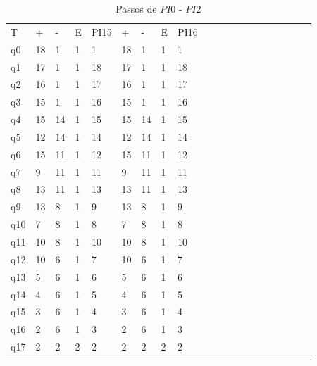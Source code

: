 \documentclass[12pt,a4paper]{report}
\begin{document}
\begin{table}[ht]
\caption{\label{tab:table-name} Passos de $PI0$ - $PI2$}
\centering
\begin{tabular}{ l l l l l l l l l l l l l l l l l l l l }
\hline
\hline
T      & +  & -  & E & PI15 & +  & -  & E & PI16 &  &  &  &  &  &  &  &  &  &  &  \\
q0  & 18 & 1  & 1 & 1    & 18 & 1  & 1 & 1    &  &  &  &  &  &  &  &  &  &  &  \\
q1  & 17 & 1  & 1 & 18   & 17 & 1  & 1 & 18   &  &  &  &  &  &  &  &  &  &  &  \\
q2  & 16 & 1  & 1 & 17   & 16 & 1  & 1 & 17   &  &  &  &  &  &  &  &  &  &  &  \\
q3  & 15 & 1  & 1 & 16   & 15 & 1  & 1 & 16   &  &  &  &  &  &  &  &  &  &  &  \\
q4  & 15 & 14 & 1 & 15   & 15 & 14 & 1 & 15   &  &  &  &  &  &  &  &  &  &  &  \\
q5  & 12 & 14 & 1 & 14   & 12 & 14 & 1 & 14   &  &  &  &  &  &  &  &  &  &  &  \\
q6  & 15 & 11 & 1 & 12   & 15 & 11 & 1 & 12   &  &  &  &  &  &  &  &  &  &  &  \\
q7  & 9  & 11 & 1 & 11   & 9  & 11 & 1 & 11   &  &  &  &  &  &  &  &  &  &  &  \\
q8  & 13 & 11 & 1 & 13   & 13 & 11 & 1 & 13   &  &  &  &  &  &  &  &  &  &  &  \\
q9  & 13 & 8  & 1 & 9    & 13 & 8  & 1 & 9    &  &  &  &  &  &  &  &  &  &  &  \\
q10 & 7  & 8  & 1 & 8    & 7  & 8  & 1 & 8    &  &  &  &  &  &  &  &  &  &  &  \\
q11 & 10 & 8  & 1 & 10   & 10 & 8  & 1 & 10   &  &  &  &  &  &  &  &  &  &  &  \\
q12 & 10 & 6  & 1 & 7    & 10 & 6  & 1 & 7    &  &  &  &  &  &  &  &  &  &  &  \\
q13 & 5  & 6  & 1 & 6    & 5  & 6  & 1 & 6    &  &  &  &  &  &  &  &  &  &  &  \\
q14 & 4  & 6  & 1 & 5    & 4  & 6  & 1 & 5    &  &  &  &  &  &  &  &  &  &  &  \\
q15 & 3  & 6  & 1 & 4    & 3  & 6  & 1 & 4    &  &  &  &  &  &  &  &  &  &  &  \\
q16 & 2  & 6  & 1 & 3    & 2  & 6  & 1 & 3    &  &  &  &  &  &  &  &  &  &  &  \\
q17 & 2  & 2  & 2 & 2    & 2  & 2  & 2 & 2    &  &  &  &  &  &  &  &  &  &  &  \\ \hline
       &    &    &   &      &    &    &   &      &  &  &  &  &  &  &  &  &  &  &  \\
       \hline
\end{tabular}
\end{table}
\end{document}
